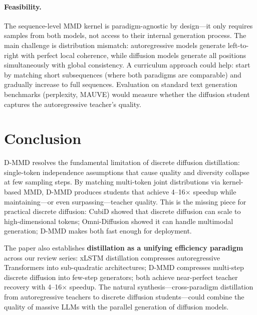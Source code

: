 \documentclass[11pt]{article}
\begin{document}
\paragraph{Feasibility.}
The sequence-level MMD kernel is paradigm-agnostic by design---it only requires samples from both models, not access to their internal generation process.
The main challenge is distribution mismatch: autoregressive models generate left-to-right with perfect local coherence, while diffusion models generate all positions simultaneously with global consistency.
A curriculum approach could help: start by matching short subsequences (where both paradigms are comparable) and gradually increase to full sequences.
Evaluation on standard text generation benchmarks (perplexity, MAUVE) would measure whether the diffusion student captures the autoregressive teacher's quality.

\section{Conclusion}

D-MMD resolves the fundamental limitation of discrete diffusion distillation: single-token independence assumptions that cause quality and diversity collapse at few sampling steps.
By matching multi-token joint distributions via kernel-based MMD, D-MMD produces students that achieve 4--16$\times$ speedup while maintaining---or even surpassing---teacher quality.
This is the missing piece for practical discrete diffusion: CubiD showed that discrete diffusion can scale to high-dimensional tokens; Omni-Diffusion showed it can handle multimodal generation; D-MMD makes both fast enough for deployment.

The paper also establishes \textbf{distillation as a unifying efficiency paradigm} across our review series:
xLSTM distillation compresses autoregressive Transformers into sub-quadratic architectures;
D-MMD compresses multi-step discrete diffusion into few-step generators;
both achieve near-perfect teacher recovery with 4--16$\times$ speedup.
The natural synthesis---cross-paradigm distillation from autoregressive teachers to discrete diffusion students---could combine the quality of massive LLMs with the parallel generation of diffusion models.
\end{document}
